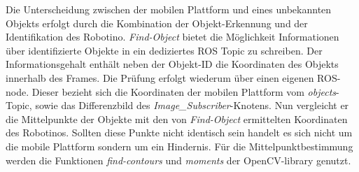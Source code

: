 	
	Die Unterscheidung zwischen der mobilen Plattform und eines unbekannten Objekts erfolgt durch die Kombination der Objekt-Erkennung und der Identifikation des Robotino. \textit{Find-Object} bietet die Möglichkeit Informationen über identifizierte Objekte in ein dediziertes ROS Topic zu schreiben. Der Informationsgehalt enthält neben der Objekt-ID die Koordinaten des Objekts innerhalb des Frames. Die Prüfung erfolgt wiederum über einen eigenen ROS-node. Dieser bezieht sich die Koordinaten der mobilen Plattform vom \textit{objects}-Topic, sowie das Differenzbild des \textit{Image\_Subscriber}-Knotens. Nun vergleicht er die Mittelpunkte der Objekte mit den von \textit{Find-Object} ermittelten Koordinaten des Robotinos. Sollten diese Punkte nicht identisch sein handelt es sich nicht um die mobile Plattform sondern um ein Hindernis. Für die Mittelpunktbestimmung werden die Funktionen \textit{find-contours} und \textit{moments} der OpenCV-library genutzt. 

